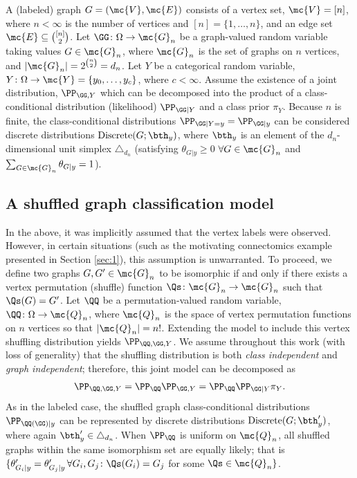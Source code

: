 A (labeled) graph $G=(\mc{V},\mc{E})$ consists of a vertex set, $\mc{V}=[n]$, where $n < \infty$ is the number of vertices and $[n]=\{1,\ldots, n\}$, and an edge set $\mc{E} \subseteq \binom{[n]}{2}$.
Let $\GG\colon \Omega \to \mc{G}_n$ be a graph-valued random variable taking values $G\in \mc{G}_n$, where $\mc{G}_n$ is the set of graphs on $n$ vertices, and $|\mc{G}_n|=2^{\binom{n}{2}}=d_n$. 
Let $Y$ be a categorical random variable, $Y\colon \Omega \to \mc{Y}=\{y_0,\ldots, y_{c}\}$, where $c< \infty$.  Assume the existence of a joint distribution, $\PP_{\GG,Y}$ which can be decomposed into the product of a class-conditional distribution (likelihood) $\PP_{\GG|Y}$ and a class prior $\pi_Y$. Because $n$ is finite, the class-conditional  distributions $\PP_{\GG | Y=y}=\PP_{\GG|y}$ can be considered discrete distributions $\text{Discrete}(G; \bth_y)$, where $\bth_y$ is an element of the $d_n$-dimensional unit simplex $\triangle_{d_n}$ (satisfying $\theta_{G|y}\geq 0$ $\forall G \in \mc{G}_n$ and $\sum_{G \in \mc{G}_n} \theta_{G|y}=1$).



\subsection{A shuffled graph classification model} %
\label{sub:a_shuffled_graph_classification_model}


In the above, it was implicitly assumed that the vertex labels were observed.  However, in certain situations (such as the motivating connectomics example presented in Section \ref{sec:1}), this assumption is unwarranted.  To proceed, we define two graphs $G,G' \in \mc{G}_n$ to be isomorphic if and only if there exists a vertex permutation (shuffle) function $\Qs\colon\mc{G}_n \to \mc{G}_n$ such that $\Qs(G)=G'$.  Let $\QQ$ be a permutation-valued random variable, $\QQ\colon\Omega \to \mc{Q}_n$, where $\mc{Q}_n$ is the space of vertex permutation functions on $n$ vertices so that $|\mc{Q}_n|=n!$.  Extending the model to include this vertex shuffling distribution yields $\PP_{\QQ,\GG,Y}$.  We assume throughout this work (with loss of generality) that the shuffling distribution is both \emph{class independent} and \emph{graph independent}; therefore, this joint model can be decomposed as
\begin{align}
	\PP_{\QQ,\GG,Y} = \PP_{\QQ} \PP_{\GG,Y} = \PP_{\QQ} \PP_{\GG |Y} \pi_Y.
\end{align}
As in the labeled case, the shuffled graph class-conditional distributions $\PP_{\QQ(\GG)|y}$ can be represented by discrete distributions $\text{Discrete}(G; \bth_y')$, where again $\bth_y' \in \triangle_{d_n}$.  When $\PP_{\QQ}$ is uniform on $\mc{Q}_n$, all shuffled graphs within the same isomorphism set are equally likely; that is  $\{\theta_{G_i|y}' = \theta_{G_j|y}' \, \forall G_i,G_j \colon \Qs(G_i)=G_j$ for some $\Qs \in \mc{Q}_n\}$.


